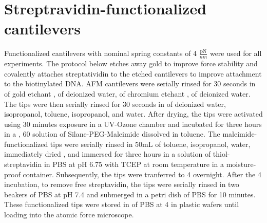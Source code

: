 \section{Streptravidin-functionalized cantilevers}

Functionalized cantilevers with nominal spring constants of 4 $\frac{\text{pN}}{nm}$  were used for all experiments. The protocol below etches away gold to improve force stability\cite{sullan_atomic_2013} and covalently attaches streptatividin to the etched cantilevers to improve attachment to the biotinylated DNA. AFM cantilevers  were serially rinsed for 30 seconds in  of gold etchant ,  of deionized water,  of chromium etchant ,  of deionized water. The tips were then serially rinsed for 30 seconds in  of deionized water, isopropanol, toluene, isopropanol, and water. After drying, the tips were activated using 30 minutes exposure in a UV-Ozone chamber and incubated for three hours in a , 60\degreeC{} solution of   Silane-PEG-Maleimide  dissolved in toluene. The maleimide-functionalized tips were serially rinsed in 50mL of toluene, isopropanol, water, immediately dried , and immersed for three hours in a  solution of thiol-streptavidin  in PBS at pH 6.75 with  TCEP  at room temperature in a moisture-proof container. Subsequently, the tips were tranferred to 4\degreeC{} overnight. After the 4\degreeC{} incubation, to remove free streptavidin, the tips were serially rinsed in two  beakers of PBS at pH 7.4 and submerged in a  petri dish of PBS for 10 minutes. These functionalized tips were stored in  of PBS at 4\degreeC{} in plastic wafers  until loading into the atomic force microscope. 


